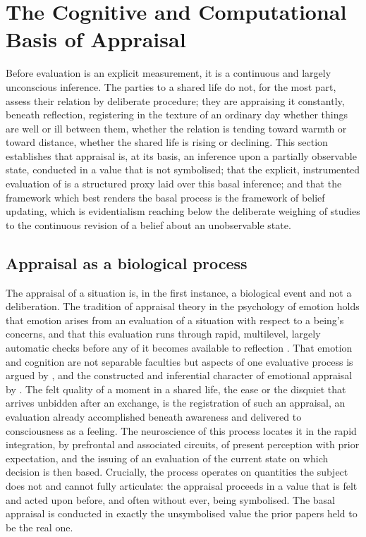 \section{The Cognitive and Computational Basis of Appraisal}
\label{p11:sec:appraisal}

\noindent
Before evaluation is an explicit measurement, it is a continuous and largely unconscious inference. The parties to a shared life do not, for the most part, assess their relation by deliberate procedure; they are appraising it constantly, beneath reflection, registering in the texture of an ordinary day whether things are well or ill between them, whether the relation is tending toward warmth or toward distance, whether the shared life is rising or declining. This section establishes that appraisal is, at its basis, an inference upon a partially observable state, conducted in a value that is not symbolised; that the explicit, instrumented evaluation of  is a structured proxy laid over this basal inference; and that the framework which best renders the basal process is the framework of belief updating, which is evidentialism reaching below the deliberate weighing of studies to the continuous revision of a belief about an unobservable state.

\subsection{Appraisal as a biological process}
\label{p11:sec:ap-bio}

The appraisal of a situation is, in the first instance, a biological event and not a deliberation. The tradition of appraisal theory in the psychology of emotion holds that emotion arises from an evaluation of a situation with respect to a being's concerns, and that this evaluation runs through rapid, multilevel, largely automatic checks before any of it becomes available to reflection \parencite{lazarus1991,scherer2001}. That emotion and cognition are not separable faculties but aspects of one evaluative process is argued by \textcite{pessoa2008}, and the constructed and inferential character of emotional appraisal by \textcite{barrett2017}. The felt quality of a moment in a shared life, the ease or the disquiet that arrives unbidden after an exchange, is the registration of such an appraisal, an evaluation already accomplished beneath awareness and delivered to consciousness as a feeling. The neuroscience of this process locates it in the rapid integration, by prefrontal and associated circuits, of present perception with prior expectation, and the issuing of an evaluation of the current state on which decision is then based. Crucially, the process operates on quantities the subject does not and cannot fully articulate: the appraisal proceeds in a value that is felt and acted upon before, and often without ever, being symbolised. The basal appraisal is conducted in exactly the unsymbolised value the prior papers held to be the real one.

